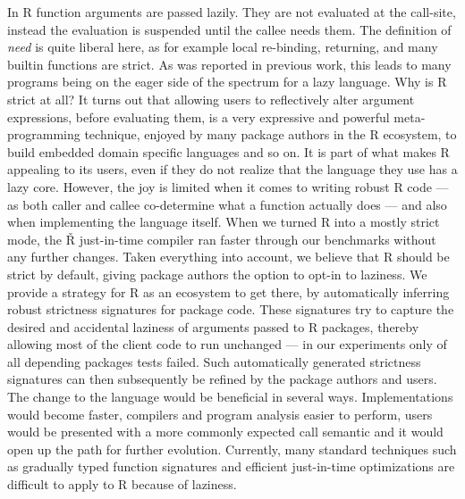 \documentclass[review,nonacm,screen,acmsmall,anonymous=true]{acmart}
\newcommand{\authorcomment}[3]{}
\newcommand{\SK}[1]{\authorcomment{yellow}{SK}{#1}}
\renewcommand{\Rsh}{{\sf\v R}\xspace}
\begin{document}
In R function arguments are passed lazily. They are not evaluated at the
call-site, instead the evaluation is suspended until the callee needs them. The
definition of \emph{need} is quite liberal here, as for example local
re-binding, returning, and many builtin functions are strict. As was reported in
previous work, this leads to many programs being on the eager side of the
spectrum for a lazy language. Why is R strict \SK{you mean lazy?} at all? It turns out that
allowing users to reflectively alter argument expressions, before evaluating
them, is a very expressive and powerful meta-programming technique, enjoyed by
many package authors in the R ecosystem, to build embedded domain specific languages
and so on. It is part of what makes R appealing to its users, even
if they do not realize that the language they use has a lazy core. However,
the joy is limited when it comes to writing robust R code --- as both caller and
callee co-determine what a function actually does --- and also when implementing
the language itself. When we turned R into a mostly strict mode, the \Rsh just-in-time
compiler ran \speedupRshStrict faster through our benchmarks without any
further changes. Taken everything into account, we believe that R should be
strict by default, giving package authors the option to opt-in to laziness. We
provide a strategy for R as an ecosystem to get there, by automatically inferring
robust strictness signatures for package code. These signatures try to capture
the desired and accidental laziness of arguments passed to R packages, thereby
allowing most of the client code to run unchanged --- in our experiments only
\robustnesResult of all depending packages tests failed. Such automatically
generated strictness signatures can then subsequently be refined by the package authors and
users. The change to the language would be beneficial in several ways.
Implementations would become faster, compilers and program analysis easier to
perform, users would be presented with a more commonly expected call semantic
and it would open up the path for further evolution. Currently, many standard
techniques such as gradually typed function signatures and efficient just-in-time
optimizations are difficult to apply to R because of laziness.



\end{document}
